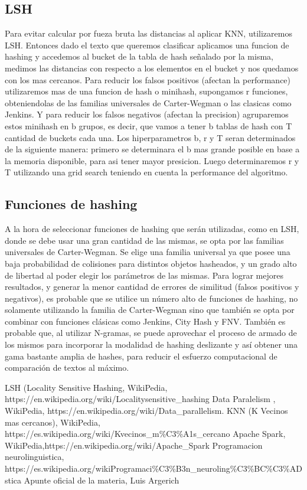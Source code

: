 \documentclass[a4paper,10pt]{article}
\begin{document}
	
	\subsection{LSH}
	
	Para evitar calcular por fueza bruta las distancias al aplicar KNN, utilizaremos LSH. Entonces dado el texto que queremos clasificar aplicamos una funcion de hashing y accedemos al bucket de la tabla de hash señalado por la misma, medimos las distancias con respecto a los elementos en el bucket y nos quedamos con los mas cercanos. Para reducir los falsos positivos (afectan la performance) utilizaremos mas de una funcion de hash o minihash, supongamos r funciones, obteniendolas de las familias universales de Carter-Wegman o las clasicas como Jenkins. Y para reducir los falsos negativos (afectan la precision) agruparemos estos minihash en b grupos, es decir, que vamos a tener b tablas de hash con T cantidad de buckets cada una.
	 Los hiperparametros b, r y T seran determinados de la siguiente manera: primero se determinara el b mas grande posible en base a la memoria disponible, para asi tener mayor presicion. Luego determinaremos r y T utilizando una grid search teniendo en cuenta la performance del algoritmo.

	
	\subsection{Funciones de hashing}

	A la hora de seleccionar funciones de hashing que ser\'{a}n utilizadas, como en LSH, donde se debe usar una gran cantidad de las mismas, se opta por las familias universales de Carter-Wegman. Se elige una familia universal ya que posee una baja probabilidad de colisiones para distintos objetos hasheados, y un grado alto de libertad al poder elegir los par\'{a}metros de las mismas. Para lograr mejores resultados, y generar la menor cantidad de errores de similitud (falsos positivos y negativos), es probable que se utilice un n\'{u}mero alto de funciones de hashing, no solamente utilizando la familia de Carter-Wegman sino que tambi\'{e}n se opta por combinar con funciones cl\'{a}sicas como Jenkins, City Hash y FNV.
	Tambi\'{e}n es probable que, al utilizar N-gramas, se puede aprovechar el proceso de armado de los mismos para incorporar la modalidad de hashing deslizante y as\'{i} obtener una gama bastante amplia de hashes, para reducir el esfuerzo computacional de comparaci\'{o}n de textos al m\'{a}ximo.
	
	\begin{thebibliography}{99}
		 LSH (Locality Sensitive Hashing, WikiPedia, https://en.wikipedia.org/wiki/Locality\-sensitive\_hashing
		 Data Paralelism , WikiPedia, https://en.wikipedia.org/wiki/Data\_parallelism.
		 KNN (K Vecinos mas cercanos), WikiPedia, https://es.wikipedia.org/wiki/K\-vecinos\_m\%C3\%A1s\_cercano
		 Apache Spark, WikiPedia,https://en.wikipedia.org/wiki/Apache\_Spark
		 Programacion neurolinguistica, https://es.wikipedia.org/wikiProgramaci\%C3\%B3n\_neuroling\%C3\%BC\%C3\%ADstica
		 Apunte oficial de la materia, Luis Argerich

	\end{thebibliography}
	
\end{document}

